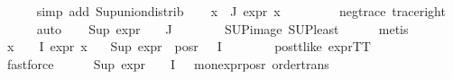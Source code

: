 \begin{isabellebody}
\ \ \ \ \isamarkupfalse%
\ {\isacharparenleft}{\kern0pt}simp\ add{\isacharcolon}{\kern0pt}\ Sup{\isacharunderscore}{\kern0pt}union{\isacharunderscore}{\kern0pt}distrib{\isacharparenright}{\kern0pt}\isanewline
\ \ \isamarkupfalse%
\ {\isachardoublequoteopen}{\isasymforall}x{\isasymin}{\isasymPhi}\ {\isacharbackquote}{\kern0pt}\ J{\isachardot}{\kern0pt}\ expr{\isacharunderscore}{\kern0pt}{}\ x\ {\isasymle}\ {}{\isachardoublequoteclose}\ \isanewline
\ \ \ \ \isamarkupfalse%
\ neg{\isacharunderscore}{\kern0pt}trace\ trace{\isacharunderscore}{\kern0pt}right\isanewline
\ \ \ \ \isamarkupfalse%
\ auto\isanewline
\ \ \isamarkupfalse%
\ {\isachardoublequoteopen}Sup\ {\isacharparenleft}{\kern0pt}{\isacharparenleft}{\kern0pt}expr{\isacharunderscore}{\kern0pt}{}\ {\isasymcirc}\ {\isasymPhi}{\isacharparenright}{\kern0pt}\ {\isacharbackquote}{\kern0pt}\ J{\isacharparenright}{\kern0pt}\ {\isasymle}\ {}{\isachardoublequoteclose}\isanewline
\ \ \ \ \isamarkupfalse%
\ SUP{\isacharunderscore}{\kern0pt}image\ SUP{\isacharunderscore}{\kern0pt}least\isanewline
\ \ \ \ \isamarkupfalse%
\ metis\isanewline
\ \ \isamarkupfalse%
\ {\isachardoublequoteopen}{\isasymforall}x\ {\isasymin}\ {\isacharparenleft}{\kern0pt}{\isasymPhi}\ {\isacharbackquote}{\kern0pt}\ I{\isacharparenright}{\kern0pt}{\isachardot}{\kern0pt}\ expr{\isacharunderscore}{\kern0pt}{}\ x\ {\isasymle}\ {}{\isachardoublequoteclose}\isanewline
{}\ {\isachardoublequoteopen}Sup\ {\isacharparenleft}{\kern0pt}{\isacharparenleft}{\kern0pt}expr{\isacharunderscore}{\kern0pt}{}\ {\isacharbackquote}{\kern0pt}\ {\isacharparenleft}{\kern0pt}pos{\isacharunderscore}{\kern0pt}r\ {\isacharparenleft}{\kern0pt}{\isasymPhi}\ {\isacharbackquote}{\kern0pt}\ I{\isacharparenright}{\kern0pt}{\isacharparenright}{\kern0pt}{\isacharparenright}{\kern0pt}{\isacharparenright}{\kern0pt}\ {\isasymle}\ {}{\isachardoublequoteclose}\isanewline
\ \ \ \ \isamarkupfalse%
\ pos{\isacharunderscore}{\kern0pt}tt{\isacharunderscore}{\kern0pt}like\ expr{\isacharunderscore}{\kern0pt}TT\isanewline
\ \ \ \ \ \isamarkupfalse%
\ fastforce\isanewline
\ \ \ \ \isamarkupfalse%
\ {\isacartoucheopen}Sup\ {\isacharparenleft}{\kern0pt}expr{\isacharunderscore}{\kern0pt}{}\ {\isacharbackquote}{\kern0pt}\ {\isasymPhi}\ {\isacharbackquote}{\kern0pt}\ I{\isacharparenright}{\kern0pt}\ {\isasymle}\ {}{\isacartoucheclose}\ mon{\isacharunderscore}{\kern0pt}expr{\isacharunderscore}{\kern0pt}{}{\isacharunderscore}{\kern0pt}pos{\isacharunderscore}{\kern0pt}r\ order{\isacharunderscore}{\kern0pt}trans\ \isanewline

\end{isabellebody}
